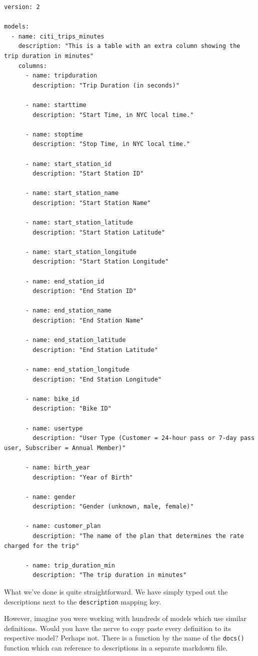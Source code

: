 \documentclass[
]{book}
\begin{document}
\begin{verbatim}
version: 2

models:
  - name: citi_trips_minutes
    description: "This is a table with an extra column showing the trip duration in minutes"
    columns:
      - name: tripduration
        description: "Trip Duration (in seconds)"

      - name: starttime
        description: "Start Time, in NYC local time."
      
      - name: stoptime
        description: "Stop Time, in NYC local time."

      - name: start_station_id
        description: "Start Station ID"
      
      - name: start_station_name
        description: "Start Station Name"

      - name: start_station_latitude
        description: "Start Station Latitude"
      
      - name: start_station_longitude
        description: "Start Station Longitude"

      - name: end_station_id
        description: "End Station ID"

      - name: end_station_name
        description: "End Station Name"

      - name: end_station_latitude
        description: "End Station Latitude"

      - name: end_station_longitude
        description: "End Station Longitude"
      
      - name: bike_id
        description: "Bike ID"
      
      - name: usertype
        description: "User Type (Customer = 24-hour pass or 7-day pass user, Subscriber = Annual Member)"

      - name: birth_year
        description: "Year of Birth"

      - name: gender
        description: "Gender (unknown, male, female)"

      - name: customer_plan
        description: "The name of the plan that determines the rate charged for the trip"

      - name: trip_duration_min
        description: "The trip duration in minutes"
\end{verbatim}

What we've done is quite straightforward. We have simply typed out the descriptions next to the \texttt{description} mapping key.

However, imagine you were working with hundreds of models which use similar definitions. Would you have the nerve to copy paste every definition to its respective model? Perhaps not. There is a function by the name of the \texttt{docs()} function which can reference to descriptions in a separate markdown file.
\end{document}
